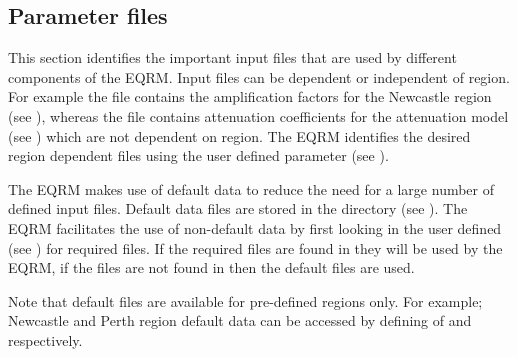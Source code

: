 \subsection{Parameter files}
\label{sec:application-parfiles}

This section identifies the important input files that are used by
different components of the EQRM. Input files can be dependent or
independent of region. For example the file
  contains the amplification factors
for the Newcastle region (see ), whereas the file
contains attenuation coefficients for the \citet*{dr_Toro97a}
attenuation model (see ) which are not dependent on
region. The EQRM identifies the desired region dependent files
using the user defined parameter  (see
).

The EQRM makes use of default data to reduce the need for a large
number of defined input files. Default data files are stored in
the directory  (see
). The EQRM facilitates the use of
non-default data by first looking in the user defined
  (see ) for
required files. If the required files are found in
  they will be used by the EQRM, if the files
are not found in   then the default files
are used.

Note that default files are available for pre-defined regions
only. For example; Newcastle and Perth region default data can be
accessed by defining  of \typenewc and
\typeperth respectively.

